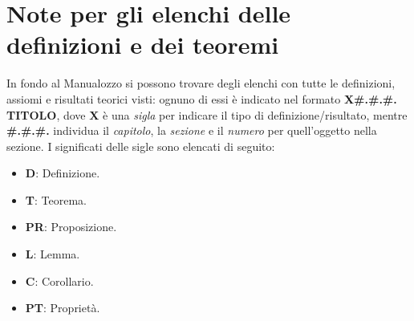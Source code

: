 \section*{Note per gli elenchi delle definizioni e dei teoremi}
In fondo al Manualozzo si possono trovare degli elenchi con tutte le definizioni, assiomi e risultati teorici visti: ognuno di essi è indicato nel formato \textbf{\textsc{X\#.\#.\#. TITOLO}}, dove \textbf{\textsc{X}} è una \textit{sigla} per indicare il tipo di definizione/risultato, mentre \textbf{\textsc{\#.\#.\#.}} individua il \textit{capitolo}, la \textit{sezione} e il \textit{numero} per quell'oggetto nella sezione. I significati delle sigle sono elencati di seguito:
\begin{multicols}{2}
	\begin{itemize}
		\item \textbf{\textsc{D}}: Definizione.
		\item \textbf{\textsc{T}}: Teorema.
		\item \textbf{\textsc{PR}}: Proposizione.
		\item \textbf{\textsc{L}}: Lemma.
		\item \textbf{\textsc{C}}: Corollario.
		\item \textbf{\textsc{PT}}: Proprietà.
	\end{itemize}
\end{multicols}


